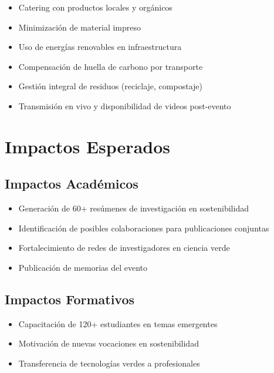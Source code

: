 \documentclass[12pt,a4paper]{article}
\begin{document}
\begin{itemize}[label={\textcolor{verdelimpio}{\textbullet}}]
  \item Catering con productos locales y orgánicos
  \item Minimización de material impreso
  \item Uso de energías renovables en infraestructura
  \item Compensación de huella de carbono por transporte
  \item Gestión integral de residuos (reciclaje, compostaje)
  \item Transmisión en vivo y disponibilidad de videos post-evento
\end{itemize}

\section{Impactos Esperados}

\subsection{Impactos Académicos}

\begin{itemize}[label={\textcolor{verdeosc}{\textbullet}}]
  \item Generación de 60+ resúmenes de investigación en sostenibilidad
  \item Identificación de posibles colaboraciones para publicaciones conjuntas
  \item Fortalecimiento de redes de investigadores en ciencia verde
  \item Publicación de memorias del evento
\end{itemize}

\subsection{Impactos Formativos}

\begin{itemize}[label={\textcolor{verdeosc}{\textbullet}}]
  \item Capacitación de 120+ estudiantes en temas emergentes
  \item Motivación de nuevas vocaciones en sostenibilidad
  \item Transferencia de tecnologías verdes a profesionales
\end{itemize}
\end{document}
